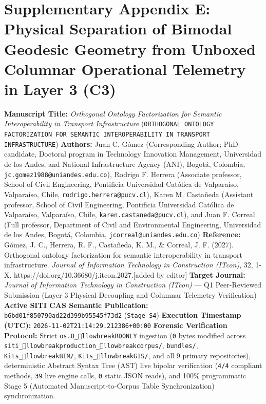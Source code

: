 \documentclass[10pt,a4paper]{article}
\begin{document}
\section*{Supplementary Appendix E: Physical Separation of Bimodal Geodesic Geometry from Unboxed Columnar Operational Telemetry in Layer 3 (C3)}

\textbf{Manuscript Title:} \textit{Orthogonal Ontology Factorization for Semantic Interoperability in Transport Infrastructure} (\texttt{ORTHOGONAL ONTOLOGY FACTORIZATION FOR SEMANTIC INTEROPERABILITY IN TRANSPORT INFRASTRUCTURE})
\textbf{Authors:} Juan C. Gómez (Corresponding Author; PhD candidate, Doctoral program in Technology Innovation Management, Universidad de los Andes, and National Infrastructure Agency (ANI), Bogotá, Colombia, \texttt{jc.gomez1988@uniandes.edu.co}), Rodrigo F. Herrera (Associate professor, School of Civil Engineering, Pontificia Universidad Católica de Valparaíso, Valparaíso, Chile, \texttt{rodrigo.herrera@pucv.cl}), Karen M. Castañeda (Assistant professor, School of Civil Engineering, Pontificia Universidad Católica de Valparaíso, Valparaíso, Chile, \texttt{karen.castaneda@pucv.cl}), and Juan F. Correal (Full professor, Department of Civil and Environmental Engineering, Universidad de los Andes, Bogotá, Colombia, \texttt{jcorreal@uniandes.edu.co})
\textbf{Reference:} Gómez, J. C., Herrera, R. F., Castañeda, K. M., \& Correal, J. F. (2027). Orthogonal ontology factorization for semantic interoperability in transport infrastructure. \textit{Journal of Information Technology in Construction (ITcon)}, 32, 1-X. https://doi.org/10.36680/j.itcon.2027.[added by editor]
\textbf{Target Journal:} \textit{Journal of Information Technology in Construction (ITcon)} --- Q1 Peer-Reviewed Submission (Layer 3 Physical Decoupling and Columnar Telemetry Verification)
\textbf{Active SITI CAS Semantic Publication:} \texttt{b6bd01f850790ad22d399b95545f73d2} (\texttt{Stage S4})
\textbf{Execution Timestamp (UTC):} \texttt{2026-11-02T21:14:29.212386+00:00}
\textbf{Forensic Verification Protocol:} Strict \texttt{os.O\_llowbreak{}RDONLY} ingestion (\texttt{0} bytes modified across \texttt{siti\_llowbreak{}production\_llowbreak{}corpus/}, \texttt{bundles/}, \texttt{Kits\_llowbreak{}BIM/}, \texttt{Kits\_llowbreak{}GIS/}, and all 9 primary repositories), deterministic Abstract Syntax Tree (AST) live bipolar verification (\texttt{4/4} compliant methods, \texttt{39} live engine calls, \texttt{0} static JSON reads), and 100\% programmatic Stage 5 (Automated Manuscript-to-Corpus Table Synchronization) synchronization.
\end{document}

